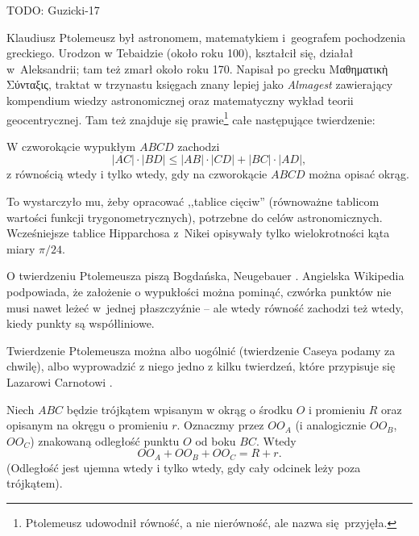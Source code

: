 {
    \Huge
    \color{red}
    TODO: Guzicki-17
}

Klaudiusz Ptolemeusz był astronomem, matematykiem i~geografem pochodzenia greckiego.
%
Urodzon w Tebaidzie (około roku 100), kształcił się, działał w~Aleksandrii; tam też zmarł około roku 170.
Napisał po grecku Μαθηματικὴ Σύνταξις, traktat w trzynastu księgach znany lepiej jako \emph{Almagest} zawierający kompendium wiedzy astronomicznej oraz matematyczny wykład teorii geocentrycznej.
Tam też znajduje się prawie\footnote{Ptolemeusz udowodnił równość, a nie nierówność, ale nazwa się przyjęła.} całe następujące twierdzenie:

\begin{theorem}[Ptolemeusza, 140 r.n.e.]
%
%
    W czworokącie wypukłym $ABCD$ zachodzi
    \begin{equation}
        |AC| \cdot |BD| \le |AB| \cdot |CD| + |BC| \cdot |AD|,
    \end{equation}
    z równością wtedy i tylko wtedy, gdy na czworokącie $ABCD$ można opisać okrąg.
\end{theorem}

To wystarczyło mu, żeby opracować ,,tablice cięciw'' (równoważne tablicom wartości funkcji trygonometrycznych), potrzebne do celów astronomicznych.
Wcześniejsze tablice Hipparchosa z~Nikei opisywały tylko wielokrotności kąta miary $\pi/24$.
%

O twierdzeniu Ptolemeusza piszą Bogdańska, Neugebauer \cite[s. 62, 63]{neugebauer_2018}.
Angielska Wikipedia podpowiada, że założenie o wypukłości można pominąć, czwórka punktów nie musi nawet leżeć w~jednej płaszczyźnie -- ale wtedy równość zachodzi też wtedy, kiedy punkty są współliniowe.

Twierdzenie Ptolemeusza można albo uogólnić (twierdzenie Caseya podamy za chwilę), albo wyprowadzić z niego jedno z kilku twierdzeń, które przypisuje się Lazarowi Carnotowi \cite{carnot_1803}.

\begin{theorem}[Carnot, 1803?]
    Niech $ABC$ będzie trójkątem wpisanym w okrąg o środku $O$ i promieniu $R$ oraz opisanym na okręgu o promieniu $r$.
    Oznaczmy przez $OO_A$ (i analogicznie $OO_B$, $OO_C$) znakowaną odległość punktu $O$ od boku $BC$.
    Wtedy 
    \begin{equation}
        OO_A + OO_B + OO_C = R + r.
    \end{equation}
    (Odległość jest ujemna wtedy i tylko wtedy, gdy cały odcinek leży poza trójkątem).
\end{theorem}

